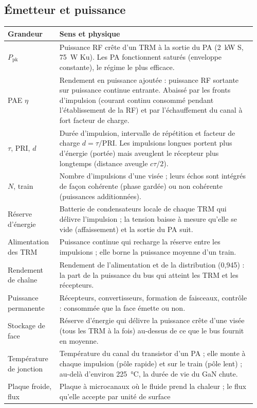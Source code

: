 \documentclass[11pt,a4paper]{article}
\begin{document}
\subsection{Émetteur et puissance}
{\small
\begin{longtable}{@{}p{0.2\linewidth}p{0.76\linewidth}@{}}
\toprule
Grandeur & Sens et physique\\
\midrule
\endhead
$P_{\mathrm{pk}}$ & Puissance RF crête d'un TRM à la sortie du PA (\SI{2}{kW} S, \SI{75}{W} Ku). Les PA fonctionnent
saturés (enveloppe constante), le régime le plus efficace.\\
PAE $\eta$ & Rendement en puissance ajoutée : puissance RF sortante sur puissance continue entrante. Abaissé par les
fronts d'impulsion (courant continu consommé pendant l'établissement de la RF) et par l'échauffement du canal à fort
facteur de charge.\\
$\tau$, PRI, $d$ & Durée d'impulsion, intervalle de répétition et facteur de charge $d = \tau/\mathrm{PRI}$. Les
impulsions longues portent plus d'énergie (portée) mais aveuglent le récepteur plus longtemps (distance aveugle
$c\tau/2$).\\
$N$, train & Nombre d'impulsions d'une visée ; leurs échos sont intégrés de façon cohérente (phase gardée) ou non
cohérente (puissances additionnées).\\
Réserve d'énergie & Batterie de condensateurs locale de chaque TRM qui délivre l'impulsion ; la tension baisse à mesure
qu'elle se vide (affaissement) et la sortie du PA suit.\\
Alimentation des TRM & Puissance continue qui recharge la réserve entre les impulsions ; elle borne la puissance moyenne
d'un train.\\
Rendement de chaîne & Rendement de l'alimentation et de la distribution (0,945) : la part de la puissance du bus qui
atteint les TRM et les récepteurs.\\
Puissance permanente & Récepteurs, convertisseurs, formation de faisceaux, contrôle : consommée que la face émette ou
non.\\
Stockage de face & Réserve d'énergie qui délivre la puissance crête d'une visée (tous les TRM à la fois) au-dessus de ce
que le bus fournit en moyenne.\\
Température de jonction & Température du canal du transistor d'un PA ; elle monte à chaque impulsion (pôle rapide) et
sur le train (pôle lent) ; au-delà d'environ \SI{225}{\celsius}, la durée de vie du GaN chute.\\
Plaque froide, flux & Plaque à microcanaux où le fluide prend la chaleur ; le flux qu'elle accepte par unité de surface

\end{longtable}}
\end{document}
